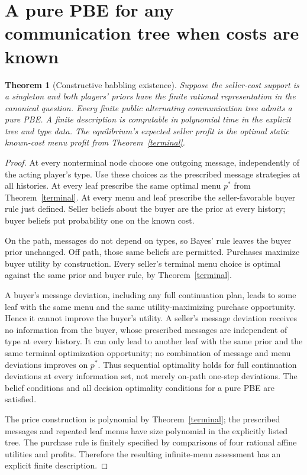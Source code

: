 \documentclass[11pt]{article}
\newtheorem{theorem}{Theorem}
\theoremstyle{remark}
\begin{document}
\section{A pure PBE for any communication tree when costs are known}
\begin{theorem}[Constructive babbling existence]\label{babble}
Suppose the seller-cost support is a singleton and both players' priors have the finite rational representation in the canonical question. Every finite public alternating communication tree admits a pure PBE. A finite description is computable in polynomial time in the explicit tree and type data. The equilibrium's expected seller profit is the optimal static known-cost menu profit from Theorem~\ref{terminal}.
\end{theorem}
\begin{proof}
At every nonterminal node choose one outgoing message, independently of the acting player's type. Use these choices as the prescribed message strategies at all histories. At every leaf prescribe the same optimal menu $p^*$ from Theorem~\ref{terminal}. At every menu and leaf prescribe the seller-favorable buyer rule just defined. Seller beliefs about the buyer are the prior at every history; buyer beliefs put probability one on the known cost.

On the path, messages do not depend on types, so Bayes' rule leaves the buyer prior unchanged. Off path, those same beliefs are permitted. Purchases maximize buyer utility by construction. Every seller's terminal menu choice is optimal against the same prior and buyer rule, by Theorem~\ref{terminal}.

A buyer's message deviation, including any full continuation plan, leads to some leaf with the same menu and the same utility-maximizing purchase opportunity. Hence it cannot improve the buyer's utility. A seller's message deviation receives no information from the buyer, whose prescribed messages are independent of type at every history. It can only lead to another leaf with the same prior and the same terminal optimization opportunity; no combination of message and menu deviations improves on $p^*$. Thus sequential optimality holds for full continuation deviations at every information set, not merely on-path one-step deviations. The belief conditions and all decision optimality conditions for a pure PBE are satisfied.

The price construction is polynomial by Theorem~\ref{terminal}; the prescribed messages and repeated leaf menus have size polynomial in the explicitly listed tree. The purchase rule is finitely specified by comparisons of four rational affine utilities and profits. Therefore the resulting infinite-menu assessment has an explicit finite description.
\end{proof}
\end{document}
